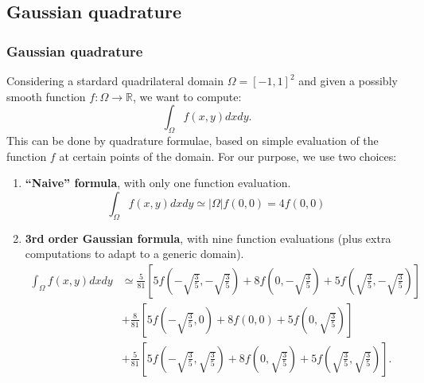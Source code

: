 \documentclass[8pt]{beamer}
\begin{document}
\subsection{Gaussian quadrature}
\begin{frame}
 \frametitle{Gaussian quadrature}
 \pause
 Considering a stardard quadrilateral domain $\Omega = [-1,1]^2$ and given a possibly smooth function $f : \Omega \to \mathbb{R}$, we want to compute:
 \begin{equation*}
  \int_{\Omega} f(x,y)dxdy.
 \end{equation*}
This can be done by quadrature formulae, based on simple evaluation of the function $f$ at certain points of the domain.
For our purpose, we use two choices:\pause
\begin{enumerate}
 \item \textbf{``Naive'' formula}, with only one function evaluation.
 \begin{equation*}
  \int_{\Omega}f(x,y)dx dy \simeq |\Omega| f(0,0)  = 4 f(0,0)
 \end{equation*}\pause
 \item \textbf{3rd order Gaussian formula}, with nine function evaluations (plus extra computations to adapt to a generic domain).
 \begin{align*}
  \int_{\Omega} f(x,y)dx dy &\simeq \frac{5}{81} \left [ 5 f \left (-\sqrt{\frac{3}{5}},-\sqrt{\frac{3}{5}} \right ) + 8 f \left (0,-\sqrt{\frac{3}{5}} \right ) + 5 f \left (\sqrt{\frac{3}{5}},-\sqrt{\frac{3}{5}} \right )\right ] \\
  &+\frac{8}{81} \left [ 5 f \left (-\sqrt{\frac{3}{5}},0 \right ) + 8 f \left (0,0 \right ) + 5 f \left (0,\sqrt{\frac{3}{5}} \right )\right ] \\
  &+\frac{5}{81} \left [ 5 f \left (-\sqrt{\frac{3}{5}},\sqrt{\frac{3}{5}} \right ) + 8 f \left (0,\sqrt{\frac{3}{5}} \right ) + 5 f \left (\sqrt{\frac{3}{5}},\sqrt{\frac{3}{5}} \right )\right ].
 \end{align*}

\end{enumerate}

\end{frame}
\end{document}
